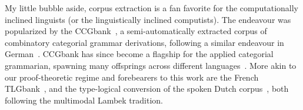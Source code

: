 My little bubble aside, corpus extraction is a fan favorite for the computationally inclined linguists (or the linguistically inclined computists).
The endeavour was popularized by the CCGbank~\cite{10.1162/coli.2007.33.3.355}, a semi-automatically extracted corpus of combinatory categorial grammar derivations, following a similar endeavour in German~\cite{hockenmaier2006creating}.
CCGbank has since become a flagship for the applied categorial grammarian, spawning many offsprings across different languages~\cite[inter alia]{johan2009converting,tse2010chinese,ambati2018hindi}.
More akin to our proof-theoretic regime and forebearers to this work are the French TLGbank~\cite{moot:inria-00494062}, and the type-logical conversion of the spoken Dutch corpus~\cite{moot2010extraction}, both following the multimodal Lambek tradition.


\nocite{macken2011dutch}




